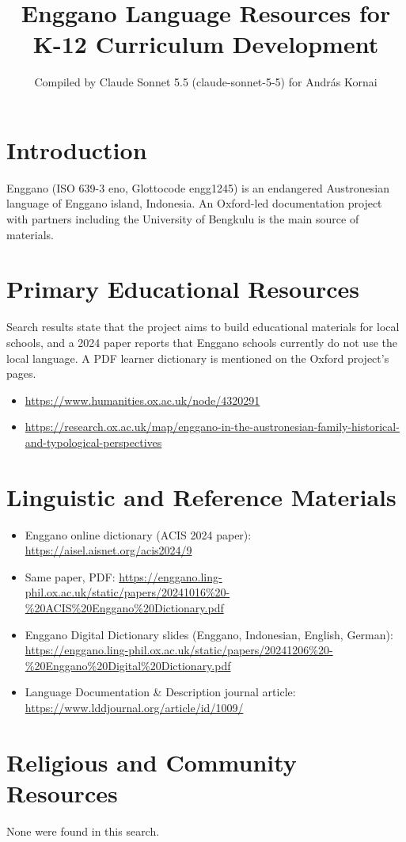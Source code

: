 \documentclass[12pt]{article}
\title{Enggano Language Resources for K-12 Curriculum Development}
\author{Compiled by Claude Sonnet 5.5 (claude-sonnet-5-5) for Andr\'as Kornai}
\date{}
\begin{document}
\maketitle
\section{Introduction}
Enggano (ISO 639-3 eno, Glottocode engg1245) is an endangered Austronesian language of Enggano island, Indonesia. An Oxford-led documentation project with partners including the University of Bengkulu is the main source of materials.
\section{Primary Educational Resources}
Search results state that the project aims to build educational materials for local schools, and a 2024 paper reports that Enggano schools currently do not use the local language. A PDF learner dictionary is mentioned on the Oxford project's pages.
\begin{itemize}
\item \url{https://www.humanities.ox.ac.uk/node/4320291}
\item \url{https://research.ox.ac.uk/map/enggano-in-the-austronesian-family-historical-and-typological-perspectives}
\end{itemize}
\section{Linguistic and Reference Materials}
\begin{itemize}
\item Enggano online dictionary (ACIS 2024 paper): \url{https://aisel.aisnet.org/acis2024/9}
\item Same paper, PDF: \url{https://enggano.ling-phil.ox.ac.uk/static/papers/20241016%20-%20ACIS%20Enggano%20Dictionary.pdf}
\item Enggano Digital Dictionary slides (Enggano, Indonesian, English, German): \url{https://enggano.ling-phil.ox.ac.uk/static/papers/20241206%20-%20Enggano%20Digital%20Dictionary.pdf}
\item Language Documentation \& Description journal article: \url{https://www.lddjournal.org/article/id/1009/}
\end{itemize}
\section{Religious and Community Resources}
None were found in this search.
\end{document}
